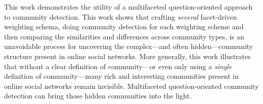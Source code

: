 \documentclass[10pt,letterpaper]{article}
\begin{document}








This work demonstrates the utility of a multifaceted question-oriented approach to community detection. This work shows that crafting \emph{several} facet-driven weighting schema, doing community detection for each weighting scheme and then comparing the similarities and differences across community types, is an unavoidable process for uncovering the complex---and often hidden---community structure present in online social networks. More generally, this work illustrates that without a clear definition of community---or even only using a \emph{single} definition of community---many rich and interesting communities present in online social networks remain invisible. Multifaceted question-oriented community detection can bring those hidden communities into the light.
\end{document}

